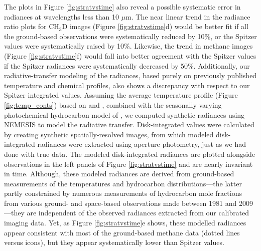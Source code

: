 \documentclass[twocolumn,10pt]{aastex631}
\begin{document}
The plots in Figure \ref{fig:stratvstime} also reveal a possible systematic error in radiances at wavelengths less than 10 $\mu$m. The near linear trend in the radiance ratio plots for CH$_3$D images (Figure \ref{fig:stratvstime}d) would be better fit if all the ground-based observations were systematically reduced by 10\%, or the Spitzer values were systematically raised by 10\%. Likewise, the trend in methane images (Figure \ref{fig:stratvstime}f) would fall into better agreement with the Spitzer values if the Spitzer radiances were systematically decreased by 50\%.  Additionally, our radiative-transfer modeling of the radiances, based purely on previously published temperature and chemical profiles, also shows a discrepancy with respect to our Spitzer integrated values.  Assuming the average temperature profile (Figure \ref{fig:temp_conts}) based on \citet{greathouse2011spatially} and \citet{moses2005photochemistry} \citep[the latter originally based on][]{orton1992thermal,yelle1993distribution,roques1994neptune}, combined with the seasonally varying photochemical hydrocarbon model of \citet{moses2018seasonal}, we computed synthetic radiances using NEMESIS \citep{irwin2008nemesis} to model the radiative transfer. Disk-integrated values were calculated by creating synthetic spatially-resolved images, from which modeled disk-integrated radiances were extracted using aperture photometry, just as we had done with true data. The modeled disk-integrated radiances are plotted alongside observations in the left panels of Figure \ref{fig:stratvstime} and are nearly invariant in time. Although, these modeled radiances are derived from ground-based measurements of the temperatures and hydrocarbon distributions---the latter partly constrained by numerous measurements of hydrocarbon mole fractions from various ground- and space-based observations made between 1981 and 2009 \citep[as described in][]{moses2018seasonal}---they are independent of the observed radiances extracted from our calibrated imaging data.  Yet, as Figure \ref{fig:stratvstime}e shows, these modelled radiances appear consistent with most of the ground-based methane data (dotted lines versus icons), but they appear systematically lower than Spitzer values.  
\end{document}
